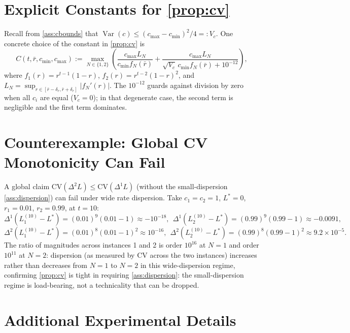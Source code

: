 \documentclass{article}
\theoremstyle{plain}
\theoremstyle{definition}
\theoremstyle{remark}
\DeclareMathOperator{\Var}{Var}
\newcommand{\CV}{\mathrm{CV}}
\begin{document}
\section{Explicit Constants for \cref{prop:cv}}
\label{app:constants}

Recall from \cref{ass:cbounds} that $\Var(c) \le (c_{\max}-c_{\min})^2/4 =: V_c$. One concrete choice of the constant in \cref{prop:cv} is
\begin{equation}
C(t,\bar r,c_{\min},c_{\max}) := \max_{N\in\{1,2\}}\left(\frac{c_{\max}L_N}{c_{\min}f_N(\bar r)} + \frac{c_{\max}L_N}{\sqrt{V_c}\,c_{\min}f_N(\bar r)+10^{-12}}\right),
\end{equation}
where $f_1(r)=r^{t-1}(1-r)$, $f_2(r)=r^{t-2}(1-r)^2$, and $L_N=\sup_{r\in[\bar r-\delta_r,\bar r+\delta_r]}|f_N'(r)|$. The $10^{-12}$ guards against division by zero when all $c_i$ are equal ($V_c=0$); in that degenerate case, the second term is negligible and the first term dominates.

\section{Counterexample: Global CV Monotonicity Can Fail}
\label{app:counterexample}

A global claim $\CV(\Delta^2 L) \le \CV(\Delta^1 L)$ (without the small-dispersion \cref{ass:dispersion}) can fail under wide rate dispersion. Take $c_1=c_2=1$, $L^*=0$, $r_1=0.01$, $r_2=0.99$, at $t=10$:
\[
\Delta^1(L_1^{(10)}-L^*)=(0.01)^9(0.01{-}1)\approx-10^{-18},\ \ \Delta^1(L_2^{(10)}-L^*)=(0.99)^9(0.99{-}1)\approx-0.0091,
\]
\[
\Delta^2(L_1^{(10)}-L^*)=(0.01)^8(0.01{-}1)^2\approx10^{-16},\ \ \Delta^2(L_2^{(10)}-L^*)=(0.99)^8(0.99{-}1)^2\approx9.2{\times}10^{-5}.
\]
The ratio of magnitudes across instances 1 and 2 is order $10^{16}$ at $N{=}1$ and order $10^{11}$ at $N{=}2$: dispersion (as measured by CV across the two instances) increases rather than decreases from $N{=}1$ to $N{=}2$ in this wide-dispersion regime, confirming \cref{prop:cv} is tight in requiring \cref{ass:dispersion}: the small-dispersion regime is load-bearing, not a technicality that can be dropped.

\section{Additional Experimental Details}
\label{app:experiment}
\end{document}
